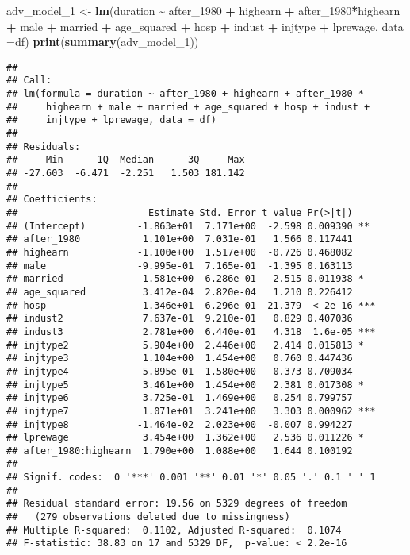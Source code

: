 \documentclass[
]{article}
\newenvironment{Shaded}{\begin{snugshade}}{\end{snugshade}}
\newcommand{\AttributeTok}[1]{\textcolor[rgb]{0.13,0.29,0.53}{#1}}
\newcommand{\FunctionTok}[1]{\textcolor[rgb]{0.13,0.29,0.53}{\textbf{#1}}}
\newcommand{\NormalTok}[1]{#1}
\newcommand{\OtherTok}[1]{\textcolor[rgb]{0.56,0.35,0.01}{#1}}
\newcommand{\SpecialCharTok}[1]{\textcolor[rgb]{0.81,0.36,0.00}{\textbf{#1}}}
\begin{document}
\begin{Shaded}
\begin{Highlighting}[]
\NormalTok{adv\_model\_1 }\OtherTok{\textless{}{-}} \FunctionTok{lm}\NormalTok{(duration }\SpecialCharTok{\textasciitilde{}}\NormalTok{ after\_1980 }\SpecialCharTok{+}\NormalTok{ highearn }\SpecialCharTok{+} 
\NormalTok{after\_1980}\SpecialCharTok{*}\NormalTok{highearn }\SpecialCharTok{+}\NormalTok{ male }\SpecialCharTok{+}\NormalTok{ married }\SpecialCharTok{+}\NormalTok{ age\_squared }\SpecialCharTok{+} 
\NormalTok{hosp }\SpecialCharTok{+}\NormalTok{ indust }\SpecialCharTok{+}\NormalTok{ injtype }\SpecialCharTok{+}\NormalTok{ lprewage, }\AttributeTok{data =}\NormalTok{df)}
\FunctionTok{print}\NormalTok{(}\FunctionTok{summary}\NormalTok{(adv\_model\_1))}
\end{Highlighting}
\end{Shaded}

\begin{verbatim}
## 
## Call:
## lm(formula = duration ~ after_1980 + highearn + after_1980 * 
##     highearn + male + married + age_squared + hosp + indust + 
##     injtype + lprewage, data = df)
## 
## Residuals:
##     Min      1Q  Median      3Q     Max 
## -27.603  -6.471  -2.251   1.503 181.142 
## 
## Coefficients:
##                       Estimate Std. Error t value Pr(>|t|)    
## (Intercept)         -1.863e+01  7.171e+00  -2.598 0.009390 ** 
## after_1980           1.101e+00  7.031e-01   1.566 0.117441    
## highearn            -1.100e+00  1.517e+00  -0.726 0.468082    
## male                -9.995e-01  7.165e-01  -1.395 0.163113    
## married              1.581e+00  6.286e-01   2.515 0.011938 *  
## age_squared          3.412e-04  2.820e-04   1.210 0.226412    
## hosp                 1.346e+01  6.296e-01  21.379  < 2e-16 ***
## indust2              7.637e-01  9.210e-01   0.829 0.407036    
## indust3              2.781e+00  6.440e-01   4.318  1.6e-05 ***
## injtype2             5.904e+00  2.446e+00   2.414 0.015813 *  
## injtype3             1.104e+00  1.454e+00   0.760 0.447436    
## injtype4            -5.895e-01  1.580e+00  -0.373 0.709034    
## injtype5             3.461e+00  1.454e+00   2.381 0.017308 *  
## injtype6             3.725e-01  1.469e+00   0.254 0.799757    
## injtype7             1.071e+01  3.241e+00   3.303 0.000962 ***
## injtype8            -1.464e-02  2.023e+00  -0.007 0.994227    
## lprewage             3.454e+00  1.362e+00   2.536 0.011226 *  
## after_1980:highearn  1.790e+00  1.088e+00   1.644 0.100192    
## ---
## Signif. codes:  0 '***' 0.001 '**' 0.01 '*' 0.05 '.' 0.1 ' ' 1
## 
## Residual standard error: 19.56 on 5329 degrees of freedom
##   (279 observations deleted due to missingness)
## Multiple R-squared:  0.1102, Adjusted R-squared:  0.1074 
## F-statistic: 38.83 on 17 and 5329 DF,  p-value: < 2.2e-16
\end{verbatim}
\end{document}
